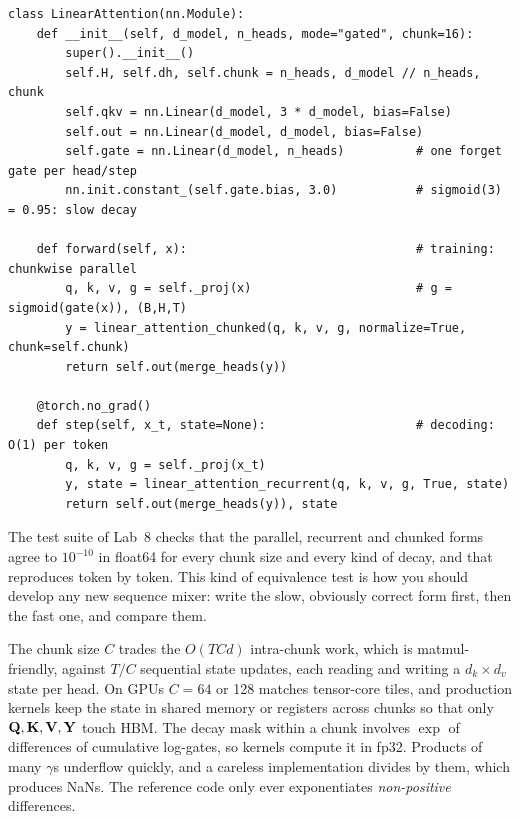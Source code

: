 \begin{lstlisting}[caption={A gated linear-attention layer with a constant-memory decoding step.},label={lst:attnalt:layer}]
class LinearAttention(nn.Module):
    def __init__(self, d_model, n_heads, mode="gated", chunk=16):
        super().__init__()
        self.H, self.dh, self.chunk = n_heads, d_model // n_heads, chunk
        self.qkv = nn.Linear(d_model, 3 * d_model, bias=False)
        self.out = nn.Linear(d_model, d_model, bias=False)
        self.gate = nn.Linear(d_model, n_heads)          # one forget gate per head/step
        nn.init.constant_(self.gate.bias, 3.0)           # sigmoid(3) = 0.95: slow decay

    def forward(self, x):                                # training: chunkwise parallel
        q, k, v, g = self._proj(x)                       # g = sigmoid(gate(x)), (B,H,T)
        y = linear_attention_chunked(q, k, v, g, normalize=True, chunk=self.chunk)
        return self.out(merge_heads(y))

    @torch.no_grad()
    def step(self, x_t, state=None):                     # decoding: O(1) per token
        q, k, v, g = self._proj(x_t)
        y, state = linear_attention_recurrent(q, k, v, g, True, state)
        return self.out(merge_heads(y)), state
\end{lstlisting}

The test suite of Lab~8 checks that the parallel, recurrent and chunked forms agree to $10^{-10}$ in
float64 for every chunk size and every kind of decay, and that  reproduces 
token by token. This kind of equivalence test is how you should develop any new sequence mixer:
write the slow, obviously correct form first, then the fast one, and compare them.

\begin{systemslens}
The chunk size $C$ trades the $O(TCd)$ intra-chunk work, which is matmul-friendly, against $T/C$ sequential
state updates, each reading and writing a $d_k\times d_v$ state per head. On GPUs $C=64$ or 128 matches
tensor-core tiles, and production kernels keep the state in shared memory or registers across chunks so
that only $\mathbf{Q},\mathbf{K},\mathbf{V},\mathbf{Y}$ touch HBM. The decay mask within a chunk involves
$\exp$ of differences of cumulative log-gates, so kernels compute it in fp32. Products of many $\gamma$s
underflow quickly, and a careless implementation divides by them, which produces NaNs. The reference
code only ever exponentiates \emph{non-positive} differences.
\end{systemslens}

